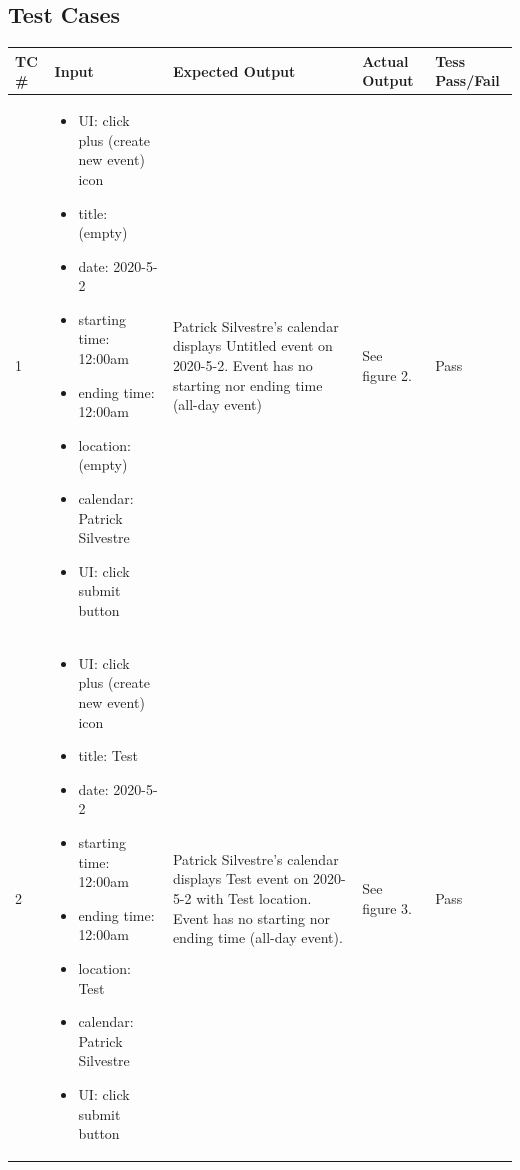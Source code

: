 \documentclass[10pt,letterpaper]{article}
\begin{document}
\subsection{Test Cases}
\begin{table}[!htb]
\begin{tabularx}{\textwidth}{lXXXl}
\toprule
TC \# &
  Input &
  Expected Output &
  Actual Output &
  Tess Pass/Fail \\ \midrule
1 &
  \begin{itemize}
    \item{UI: click plus (create new event) icon}
    \item{title: (empty)}
    \item{date: 2020-5-2}
    \item{starting time: 12:00am}
    \item{ending time: 12:00am}
    \item{location: (empty)}
    \item{calendar: Patrick Silvestre}
    \item{UI: click submit button}
  \end{itemize} &
  Patrick Silvestre's calendar displays Untitled event on 2020-5-2. Event has no starting nor ending time (all-day event) &
  See figure 2. &
  Pass \\ \midrule
2 &
  \begin{itemize}
    \item{UI: click plus (create new event) icon}    
    \item{title: Test}
    \item{date: 2020-5-2}
    \item{starting time: 12:00am}
    \item{ending time: 12:00am}
    \item{location: Test}
    \item{calendar: Patrick Silvestre}
    \item{UI: click submit button}
  \end{itemize} &
  Patrick Silvestre's calendar displays Test event on 2020-5-2 with Test location. Event has no starting nor ending time (all-day event). &
  See figure 3. &
  Pass \\ \bottomrule
\end{tabularx}
\end{table}
\end{document}
